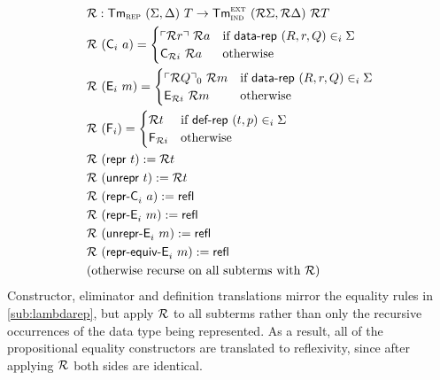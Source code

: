 \begin{align*}
  & \mathcal{R} : \textsf{Tm}_{\textsc{rep}}\ (\Sigma, \Delta)\ T \to \textsf{Tm}_{\textsc{ind}}^\textsc{ext}\ (\mathcal{R} \Sigma, \mathcal{R} \Delta)\ \mathcal{R} T \\
  &\mathcal{R}\ (\textsf{C}_i\ a) = \begin{cases}
      \ulcorner \mathcal{R} r \urcorner\ \mathcal{R} a & \text{if}\ \textsf{data-rep}\ (R, r, Q) \in_i \Sigma \\
      \textsf{C}_{\mathcal{R} i}\ \mathcal{R} a & \text{otherwise}
  \end{cases} \\
  &\mathcal{R}\ (\textsf{E}_i\ m) = \begin{cases}
      \ulcorner \mathcal{R} Q \urcorner_0\ \mathcal{R} m & \text{if}\ \textsf{data-rep}\ (R, r, Q) \in_i \Sigma \\
      \textsf{E}_{\mathcal{R} i}\ \mathcal{R} m & \text{otherwise}
  \end{cases} \\
  &\mathcal{R}\ (\textsf{F}_i) = \begin{cases}
        \mathcal{R} t & \text{if}\ \textsf{def-rep}\ (t, p) \in_i \Sigma \\
        \textsf{F}_{\mathcal{R} i} & \text{otherwise}
    \end{cases} \\
  & \mathcal{R}\ (\textsf{repr}\ t) := \mathcal{R} t \\
  & \mathcal{R}\ (\textsf{unrepr}\ t) := \mathcal{R} t \\
  & \mathcal{R}\ (\textsf{repr-C}_i\ a) := \textsf{refl} \\
  & \mathcal{R}\ (\textsf{repr-E}_i\ m) := \textsf{refl} \\
  & \mathcal{R}\ (\textsf{unrepr-E}_i\ m) := \textsf{refl} \\
  & \mathcal{R}\ (\textsf{repr-equiv-E}_i\ m) := \textsf{refl} \\
  & \text{(otherwise recurse on all subterms with $\mathcal{R}$)}
\end{align*}
Constructor, eliminator and definition translations mirror the equality rules in
\cref{sub:lambdarep}, but apply $\mathcal{R}$ to all subterms rather than only the
recursive occurrences of the data type being represented. As a result, all of
the propositional equality constructors are translated to reflexivity, since
after applying $\mathcal{R}$ both sides are identical.

